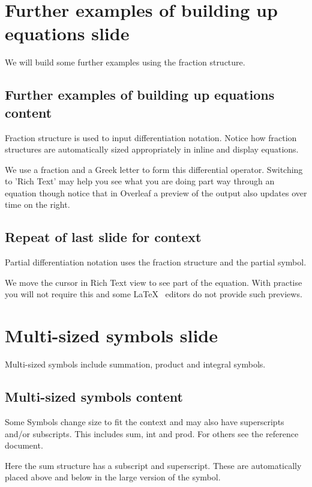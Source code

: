 \documentclass[a4paper,14pt]{extarticle}
\begin{document}
\section{Further examples of building up equations slide}

We will build some further examples using the fraction structure. 

\subsection{Further examples of building up equations content}

Fraction structure is used to input differentiation notation. Notice how fraction structures are automatically sized appropriately in inline and display equations. 

We use a fraction and a Greek letter to form this differential operator. Switching to 'Rich Text' may help you see what you are doing part way through an equation though notice that in Overleaf a preview of the output also updates over time on the right. 

\subsection{Repeat of last slide for context}

Partial differentiation notation uses the fraction structure and the partial symbol. 

We move the cursor in Rich Text view to see part of the equation. With practise you will not require this and some \LaTeX~ editors do not provide such previews. 

\section{Multi-sized symbols slide}

Multi-sized symbols include summation, product and integral symbols.

\subsection{Multi-sized symbols content}

Some Symbols change size to fit the context and may also have superscripts and/or subscripts. This includes sum, int and prod. For others see the reference document. 

Here the sum structure has a subscript and superscript. These are automatically placed above and below in the large version of the symbol. 
\end{document}
